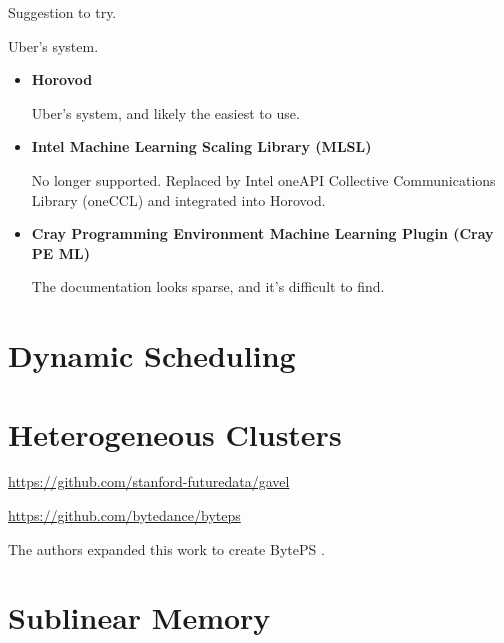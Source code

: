 Suggestion to try.


Uber's system.



\begin{itemize}
  \item \textbf{Horovod}

    Uber's system, and likely the easiest to use.
  \item \textbf{Intel Machine Learning Scaling Library (MLSL)}

    No longer supported. Replaced by Intel oneAPI Collective Communications
    Library (oneCCL) and integrated into Horovod.
  \item \textbf{Cray Programming Environment Machine Learning Plugin (Cray PE
    ML)}

    The documentation looks sparse, and it's difficult to find.
\end{itemize}


\section{Dynamic Scheduling}




\section{Heterogeneous Clusters}


\url{https://github.com/stanford-futuredata/gavel}


\url{https://github.com/bytedance/byteps}


The authors expanded this work to create BytePS \cite{osdi/2020/jiang}.

\section{Sublinear Memory}

